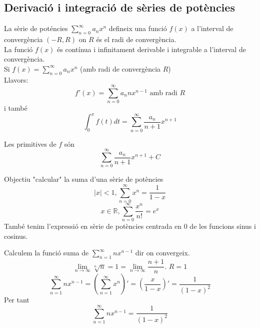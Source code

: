 \documentclass[../main.tex]{subfiles}
\begin{document}
    \subsection{Derivació i integració de sèries de potències}
    La sèrie de poténcies $\sum\limits_{n=0}^\infty a_n x^n$ defineix una funció $f(x)$ a l'interval de convergència $(-R, R)$ on $R$ és el radi de convergència.\\
    La funció $f(x)$ és contínua i infinitament derivable i integrable a l'interval de convergència.\\
    Si $f(x) = \sum\limits_{n=0}^\infty a_n x^n$ (amb radi de convergència $R$)\\Llavors:
    \begin{displaymath}
        f'(x) = \sum\limits_{n=0}^\infty a_n n x^{n-1} \text{ amb radi } R
    \end{displaymath}
    i també
    \begin{displaymath}
        \int_0^x f(t) dt = \sum\limits_{n=0}^\infty \frac{a_n}{n+1} x^{n+1}
    \end{displaymath}
    \begin{obs}
        Les primitives de $f$ són
        \begin{displaymath}
            \sum\limits_{n=0}^\infty \frac{a_n}{n+1} x^{n+1} + C
        \end{displaymath}
    \end{obs}
    Objectiu "calcular" la suma d'una sèrie de potències
    \begin{displaymath}
        |x| < 1, \sum\limits_{n=0}^\infty x^n = \frac{1}{1-x}
    \end{displaymath}
    \begin{displaymath}
        x \in \mathbb{R}, \sum\limits_{n=0}^\infty \frac{x^n}{n!} = e^x
    \end{displaymath}
    També tenim l'expressió en sèrie de potències centrada en $0$ de les funcions sinus i cosinus.
    \begin{exemple}
        Calculem la funció suma de $\sum\limits_{n=1}^\infty n x^{n-1}$ dir on convergeix.
        \begin{displaymath}
            \lim_{n \rightarrow \infty} \sqrt[n]{n} = 1 = \lim\limits_{n \rightarrow \infty} \frac{n+1}{n} \text{. } R = 1
        \end{displaymath}
        \begin{displaymath}
            \sum\limits_{n=1}^\infty n x^{n-1} = (\sum\limits_{n=1}^\infty x^n)' = (\frac{x}{1-x})' = \frac{1}{(1-x)^2}
        \end{displaymath}
        Per tant
        \begin{displaymath}
            \sum\limits_{n=1}^\infty n x^{n-1} = \frac{1}{(1-x)^2}
        \end{displaymath}
    \end{exemple}
\end{document}
